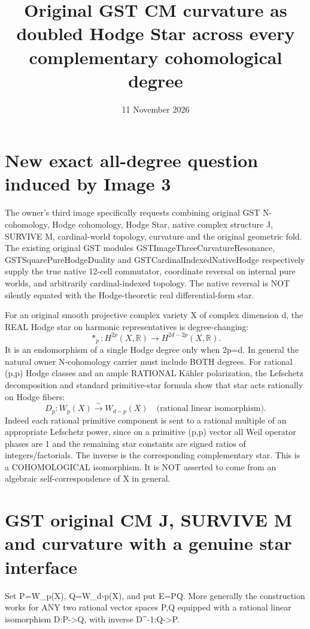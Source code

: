 \documentclass[11pt]{article}
\title{Original GST CM curvature as doubled Hodge Star across every complementary cohomological degree}
\date{11 November 2026}
\begin{document}
\maketitle

\section{New exact all-degree question induced by Image 3}
The owner's third image specifically requests combining original
GST N-cohomology, Hodge cohomology, Hodge Star, native complex
structure J, SURVIVE M, cardinal-world topology, curvature
and the original geometric fold.
The existing original GST modules
GSTImageThreeCurvatureResonance,
GSTSquarePureHodgeDuality and
GSTCardinalIndexedNativeHodge respectively
supply the true native 12-cell commutator,
coordinate reversal on internal pure worlds,
and arbitrarily cardinal-indexed topology.
The native reversal is NOT silently equated with
the Hodge-theoretic real differential-form star.

For an original smooth projective complex variety X of
complex dimension d, the REAL Hodge star on
harmonic representatives is degree-changing:
\[
*_p:H^{2p}(X,\mathbb R)\longrightarrow
 H^{2d-2p}(X,\mathbb R).
\]
It is an endomorphism of a single Hodge degree only
when 2p=d. In general the natural owner
N-cohomology carrier must include BOTH degrees.
For rational (p,p) Hodge classes and an ample
RATIONAL Kähler polarization, the Lefschetz
decomposition and standard primitive-star formula
show that star acts rationally on Hodge fibers:
\[
D_p:W_p(X)\xrightarrow{\sim}W_{d-p}(X)
\quad\text{(rational linear isomorphism).}
\]
Indeed each rational primitive component is
sent to a rational multiple of an appropriate
Lefschetz power, since on a primitive (p,p)
vector all Weil operator phases are 1 and
the remaining star constants are signed
ratios of integers/factorials. The inverse
is the corresponding complementary star.
This is a COHOMOLOGICAL isomorphism.
It is NOT asserted to come from an algebraic
self-correspondence of X in general.

\section{GST original CM J, SURVIVE M and curvature with a genuine star interface}
Set P=W_p(X), Q=W_{d-p}(X), and put
E=P\oplus Q.
More generally the construction works for
ANY two rational vector spaces P,Q equipped
with a rational linear isomorphism D:P->Q,
with inverse D^{-1}:Q->P.
\end{document}
